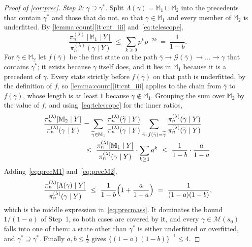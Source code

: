 \begin{proof}[Proof of \cref{cor:prec}]
    \emph{Step 2: $\gamma\supseteq\gamma^{\ast}$.} Split
    $\Lambda(\gamma)=\mathbb{M}_1\sqcup\mathbb{M}_2$ into the precedents
    that contain $\gamma^{\ast}$ and those that do not, so that
    $\gamma\in\mathbb{M}_1$ and every member of $\mathbb{M}_2$ is
    underfitted. By \cref{lemma:count}\ref{it:cnt_iii}
    and~\eqref{eq:telescope},
    \begin{equation}
        \label{eq:precM1}
        \frac{\pi_n^{(\lambda)}[\mathbb{M}_1\mid Y]}
        {\pi_n^{(\lambda)}(\gamma\mid Y)}
        \ \leq\ \sum_{k\geq0}p^{k}p^{-2k}\ =\ \frac{1}{1-b} .
    \end{equation}
    For $\bar\gamma\in\mathbb{M}_2$ let $f(\bar\gamma)$ be the first
    state on the path
    $\bar\gamma\to\mathcal{G}(\bar\gamma)\to\dots\to\gamma$ that contains
    $\gamma^{\ast}$; it exists because $\gamma$ itself does, and it lies
    in $\mathbb{M}_1$ because it is a precedent of $\gamma$. Every state
    strictly before $f(\bar\gamma)$ on that path is underfitted, by the
    definition of $f$, so \cref{lemma:count}\ref{it:cnt_iii} applies to
    the chain from $\bar\gamma$ to $f(\bar\gamma)$, whose length is at
    least $1$ because $\bar\gamma\notin\mathbb{M}_1$. Grouping the sum
    over $\mathbb{M}_2$ by the value of $f$, and
    using~\eqref{eq:telescope} for the inner ratios,
    \begin{align}
        \notag
        \frac{\pi_n^{(\lambda)}[\mathbb{M}_2\mid Y]}
        {\pi_n^{(\lambda)}(\gamma\mid Y)}
        &=\sum_{\widetilde\gamma\in\mathbb{M}_1}
        \frac{\pi_n^{(\lambda)}(\widetilde\gamma\mid Y)}
        {\pi_n^{(\lambda)}(\gamma\mid Y)}
        \sum_{\bar\gamma:\,f(\bar\gamma)=\widetilde\gamma}
        \frac{\pi_n^{(\lambda)}(\bar\gamma\mid Y)}
        {\pi_n^{(\lambda)}(\widetilde\gamma\mid Y)}\\
        \label{eq:precM2}
        &\ \leq\ \frac{\pi_n^{(\lambda)}[\mathbb{M}_1\mid Y]}
        {\pi_n^{(\lambda)}(\gamma\mid Y)}
        \cdot\sum_{k\geq1}a^{k}
        \ \leq\ \frac{1}{1-b}\cdot\frac{a}{1-a} .
    \end{align}
    Adding~\eqref{eq:precM1} and~\eqref{eq:precM2},
    \begin{equation*}
        \frac{\pi_n^{(\lambda)}[\Lambda(\gamma)\mid Y]}
        {\pi_n^{(\lambda)}(\gamma\mid Y)}
        \ \leq\ \frac{1}{1-b}\Bigl(1+\frac{a}{1-a}\Bigr)
        \ =\ \frac{1}{(1-a)(1-b)} ,
    \end{equation*}
    which is the middle expression in~\eqref{eq:precmass}. It dominates
    the bound $1/(1-a)$ of Step~1, so both cases are covered by it, and
    every $\gamma\in\mathscr{M}(s_0)$ falls into one of them: a state
    other than $\gamma^{\ast}$ is either underfitted or overfitted, and
    $\gamma^{\ast}\supseteq\gamma^{\ast}$. Finally $a,b\leq\tfrac12$
    gives $\{(1-a)(1-b)\}^{-1}\leq4$.
\end{proof}

